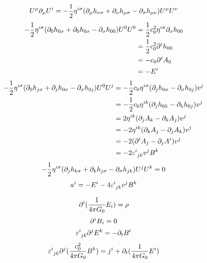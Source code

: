 \begin{equation}
    U^\mu\partial_\mu U^i=-\frac{1}{2}\eta^{i\sigma}(\partial_\mu{h}_{\nu\sigma}+\partial_\nu{h}_{\mu\sigma}-\partial_\sigma{h}_{\mu\nu})U^\mu U^\nu
\end{equation}
\begin{align}
    -\frac{1}{2}\eta^{i\sigma}(\partial_0{h}_{0\sigma}+\partial_0{h}_{0\sigma}-\partial_\sigma{h}_{00})U^0 U^0
    &=\frac{1}{2}c_0^2\eta^{i\sigma}\partial_\sigma{h}_{00}\\
    &=\frac{1}{2}c_0^2\partial^i{h}_{00}\\
    &=-c_0\partial^iA_0\\
    &=-E^i
\end{align}
\begin{align}
    -\frac{1}{2}\eta^{i\sigma}(\p_0{h}_{j\sigma}+\p_j{h}_{0\sigma}-\p_\sigma{h}_{0j})U^0 U^j
    &=-\frac{1}{2}c_0\eta^{i\sigma}(\p_j{h}_{0\sigma}-\p_\sigma{h}_{0j})v^j\\
    &=-\frac{1}{2}c_0\eta^{ik}(\p_j{h}_{0k}-\p_k{h}_{0j})v^j\\
    &=2\eta^{ik}(\p_jA_k-\p_kA_j)v^j\\
    &=-2\eta^{ik}(\p_kA_j-\p_jA_k)v^j\\
    &=-2(\p^iA_j-\p_jA^i)v^j\\
    &=-2\varepsilon^{i}_{\ph{i}jk}v^jB^k
\end{align}
\begin{align}
    -\frac{1}{2}\eta^{i\sigma}(\partial_j{h}_{k\sigma}+\partial_k{h}_{j\sigma}-\partial_\sigma{h}_{jk})U^j U^k=0
\end{align}
\begin{equation}
    a^i=-E^i-4\varepsilon^{i}_{\ph{i}jk}v^jB^k
\end{equation}

\begin{equation}
    \partial^i(\frac{1}{4\pi G_0}E_i)=\rho
\end{equation}
\begin{equation}
    \partial^iB_i=0
\end{equation}
\begin{equation}
    \varepsilon^{i}_{\ph{i}jk}\p^jE^k=-\p_tB^i
\end{equation}
\begin{equation}
    \varepsilon^{i}_{\ph{i}jk}\p^j(\frac{c_0^2}{4\pi G_0}B^k)=j^i+\p_t(\frac{1}{4\pi G_0}E^i)
\end{equation}


